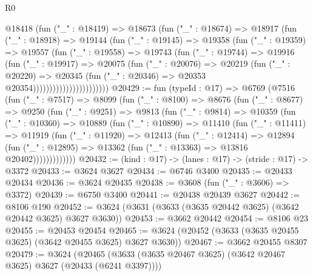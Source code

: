 \begin{lexlean}{R0}
\begin{coremodule}
                          @18418
                            (fun ("_" : @18419) =>
                            @18673
                              (fun ("_" : @18674) =>
                              @18917
                                (fun ("_" : @18918) =>
                                @19144
                                  (fun ("_" : @19145) =>
                                  @19358
                                    (fun ("_" : @19359) =>
                                    @19557
                                      (fun ("_" : @19558) =>
                                      @19743
                                        (fun ("_" : @19744) =>
                                        @19916
                                          (fun ("_" : @19917) =>
                                          @20075
                                            (fun ("_" : @20076) =>
                                            @20219
                                              (fun ("_" : @20220) =>
                                              @20345
                                                (fun ("_" : @20346) =>
                                                @20353 @20354)))))))))))))))))))))))
@20429 := fun (typeId : @17) =>
  @6769
    (@7516
      (fun ("_" : @7517) =>
      @8099
        (fun ("_" : @8100) =>
        @8676
          (fun ("_" : @8677) =>
          @9250
            (fun ("_" : @9251) =>
            @9813
              (fun ("_" : @9814) =>
              @10359
                (fun ("_" : @10360) =>
                @10889
                  (fun ("_" : @10890) =>
                  @11410
                    (fun ("_" : @11411) =>
                    @11919
                      (fun ("_" : @11920) =>
                      @12413
                        (fun ("_" : @12414) =>
                        @12894
                          (fun ("_" : @12895) =>
                          @13362 (fun ("_" : @13363) => @13816 @20402)))))))))))))
@20432 := (kind : @17) -> (lanes : @17) -> (stride : @17) -> @3372
@20433 := @3624 @3627
@20434 := @6746 @3400
@20435 := @20433 @20434
@20436 := @3624 @20435
@20438 := @3608 (fun ("_" : @3606) => @3372)
@20439 := @6750 @3400
@20441 := @20438 @20439 @3627
@20442 := @8106 @190
@20452 := @3624 (@3631 (@3633 (@3635 @20442 @3625) (@3642 @20442 @3625) @3627 @3630))
@20453 := @3662 @20442
@20454 := @8106 @23
@20455 := @20453 @20454
@20465 := @3624 (@20452 (@3633 (@3635 @20455 @3625) (@3642 @20455 @3625) @3627 @3630))
@20467 := @3662 @20455 @8307
@20479 := @3624
    (@20465 (@3633 (@3635 @20467 @3625) (@3642 @20467 @3625) @3627 (@20433 (@6241 @3397))))

\end{coremodule}
\end{lexlean}
